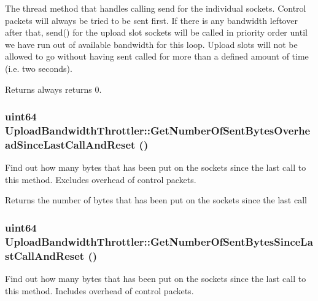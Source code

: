 The thread method that handles calling send for the individual sockets. Control packets will always be tried to be sent first. If there is any bandwidth leftover after that, send() for the upload slot sockets will be called in priority order until we have run out of available bandwidth for this loop. Upload slots will not be allowed to go without having sent called for more than a defined amount of time (i.e. two seconds).

\begin{DoxyReturn}{Returns}
always returns 0. 
\end{DoxyReturn}
\subsubsection[{GetNumberOfSentBytesOverheadSinceLastCallAndReset}]{\setlength{\rightskip}{0pt plus 5cm}uint64 UploadBandwidthThrottler::GetNumberOfSentBytesOverheadSinceLastCallAndReset ()}\label{classUploadBandwidthThrottler_a1315a85eea9d3bd820eb7124f7d0ee0e}


Find out how many bytes that has been put on the sockets since the last call to this method. Excludes overhead of control packets.

\begin{DoxyReturn}{Returns}
the number of bytes that has been put on the sockets since the last call 
\end{DoxyReturn}
\subsubsection[{GetNumberOfSentBytesSinceLastCallAndReset}]{\setlength{\rightskip}{0pt plus 5cm}uint64 UploadBandwidthThrottler::GetNumberOfSentBytesSinceLastCallAndReset ()}\label{classUploadBandwidthThrottler_a5266715b61436eca207a2f4b99c98bcf}


Find out how many bytes that has been put on the sockets since the last call to this method. Includes overhead of control packets.

